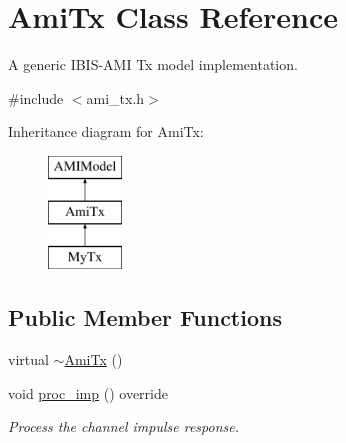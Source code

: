\hypertarget{class_ami_tx}{}\section{Ami\+Tx Class Reference}
\label{class_ami_tx}


A generic I\+B\+I\+S-\/\+A\+M\+I Tx model implementation.  




{\ttfamily \#include $<$ami\+\_\+tx.\+h$>$}

Inheritance diagram for Ami\+Tx\+:\begin{figure}[H]
\begin{center}
\leavevmode
\includegraphics[height=3.000000cm]{class_ami_tx}
\end{center}
\end{figure}
\subsection*{Public Member Functions}
\begin{DoxyCompactItemize}
\item 
virtual \hyperlink{class_ami_tx_a0a30ee85116e1f2ba7c4a8876c0b7b8e}{$\sim$\+Ami\+Tx} ()
\item 
void \hyperlink{class_ami_tx_a94649674c8e8442c1d5434d509165594}{proc\+\_\+imp} () override
\begin{DoxyCompactList}\small\item\em Process the channel impulse response. \end{DoxyCompactList}\end{DoxyCompactItemize}
